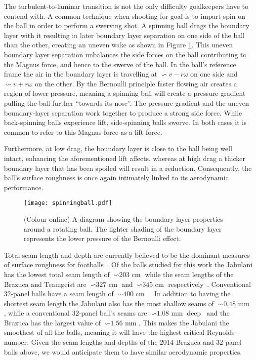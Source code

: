 \documentclass[a4paper]{article}
\begin{document}
The turbulent-to-laminar transition is not the only difficulty goalkeepers have to contend with.  A common technique when shooting for goal is to impart spin on the ball in order to perform a swerving shot.  A spinning ball drags the boundary layer with it resulting in later boundary layer separation on one side of the ball than the other, creating an uneven wake as shown in Figure \ref{fig:SpinningBall}.  This uneven boundary layer separation unbalances the side forces on the ball contributing to the Magnus force, and hence to the swerve of the ball.  In the ball's reference frame the air in the boundary layer is travelling at $\backsim v - r\omega$ on one side and $\backsim v + r\omega$ on the other.  By the Bernoulli principle faster flowing air creates a region of lower pressure, meaning a spinning ball will create a pressure gradient pulling the ball further ``towards its nose''.  The pressure gradient and the uneven boundary-layer separation work together to produce a strong side force.  While back-spinning balls experience lift, side-spinning balls swerve.  In both cases it is common to refer to this Magnus force as a lift force.  
%

Furthermore, at low drag, the boundary layer is close to the ball being well intact, enhancing the aforementioned lift affects, whereas at high drag a thicker boundary layer that has been spoiled will result in a reduction.  Consequently, the ball's surface roughness is once again intimately linked to its aerodynamic performance.      

%
%
\begin{figure}[t] 
  \centering
  {\texttt{[image: spinningball.pdf]}}
  \caption{(Colour online) A diagram showing the boundary layer properties around a rotating ball.  The lighter shading of the boundary layer represents the lower pressure of the Bernoulli effect.}
 \label{fig:SpinningBall}
\end{figure}
%
%
Total seam length and depth are currently believed to be the dominant measures of surface roughness for footballs~\cite{AsaiTandSeoK}.  Of the balls studied for this work the Jabulani has the lowest total seam length of $\backsim\textrm{203 cm}$ while the seam lengths of the Brazuca and Teamgeist are $\backsim\textrm{327 cm}$ and $\backsim\textrm{345 cm}$ respectively~\cite{ConversationArticle}.  Conventional 32-panel balls have a seam length of $\backsim\textrm{400 cm}$~\cite{AsaiTandSeoK, ConversationArticle}.  In addition to having the shortest seam length the Jabulani also has the most shallow seams of $\backsim\textrm{0.48 mm}$, while a conventional 32-panel ball's seams are $\backsim\textrm{1.08 mm}$ deep~\cite{ConversationArticle} and the Brazuca has the largest value of $\backsim\textrm{1.56 mm}$.  This makes the Jabulani the smoothest of all the balls, meaning it will have the highest critical Reynolds number.  Given the seam lengths and depths of the 2014 Brazuca and 32-panel balls above, we would anticipate them to have similar aerodynamic properties.
\end{document}
